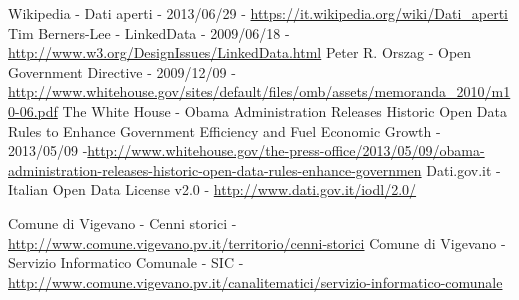 \begin{thebibliography}{100}

  Wikipedia - Dati aperti - 2013/06/29 - \url{https://it.wikipedia.org/wiki/Dati_aperti}
 Tim Berners-Lee - LinkedData - 2009/06/18 - \url{http://www.w3.org/DesignIssues/LinkedData.html}
 Peter R. Orszag - Open Government Directive - 2009/12/09 -\url{http://www.whitehouse.gov/sites/default/files/omb/assets/memoranda_2010/m10-06.pdf}
 The White House - Obama Administration Releases Historic Open Data Rules to Enhance Government Efficiency and Fuel Economic Growth - 2013/05/09 -\url{http://www.whitehouse.gov/the-press-office/2013/05/09/obama-administration-releases-historic-open-data-rules-enhance-governmen}
 Dati.gov.it - Italian Open Data License v2.0 - \url{http://www.dati.gov.it/iodl/2.0/}

 Comune di Vigevano - Cenni storici - \url{http://www.comune.vigevano.pv.it/territorio/cenni-storici}
 Comune di Vigevano - Servizio Informatico Comunale - SIC - \url{http://www.comune.vigevano.pv.it/canalitematici/servizio-informatico-comunale}

\end{thebibliography} 
